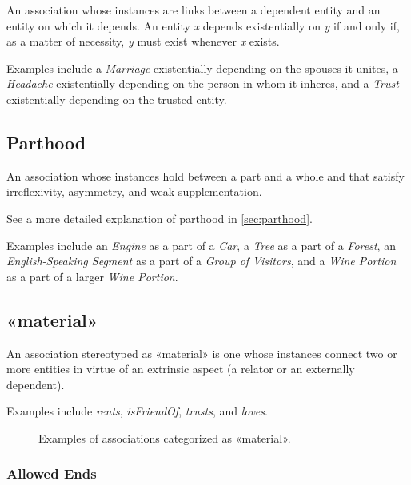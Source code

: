 An association whose instances are links between a dependent entity and an entity on which it depends. An entity \textit{x} depends existentially on \textit{y} if and only if, as a matter of necessity, \textit{y} must exist whenever \textit{x} exists.

Examples include a \textit{Marriage} existentially depending on the spouses it unites, a \textit{Headache} existentially depending on the person in whom it inheres, and a \textit{Trust} existentially depending on the trusted entity.


\subsection{Parthood}
\label{stereotype:parthood}

An association whose instances hold between a part and a whole and that satisfy irreflexivity, asymmetry, and weak supplementation. 

See a more detailed explanation of parthood in \autoref{sec:parthood}.

Examples include an \textit{Engine} as a part of a \textit{Car}, a \textit{Tree} as a part of a \textit{Forest}, an \textit{English-Speaking Segment} as a part of a \textit{Group of Visitors}, and a \textit{Wine Portion} as a part of a larger \textit{Wine Portion}.


\subsection{«material»}
\label{stereotype:material}

An association stereotyped as «material» is one whose instances connect two or more entities in virtue of an extrinsic aspect (a relator or an externally dependent).

Examples include \textit{rents}, \textit{isFriendOf}, \textit{trusts}, and \textit{loves}.

\begin{figure}[h]
    \centering
    
    \caption{Examples of associations categorized as «material».}
    \label{fig:material-example}
\end{figure}

\subsubsection{Allowed Ends}

